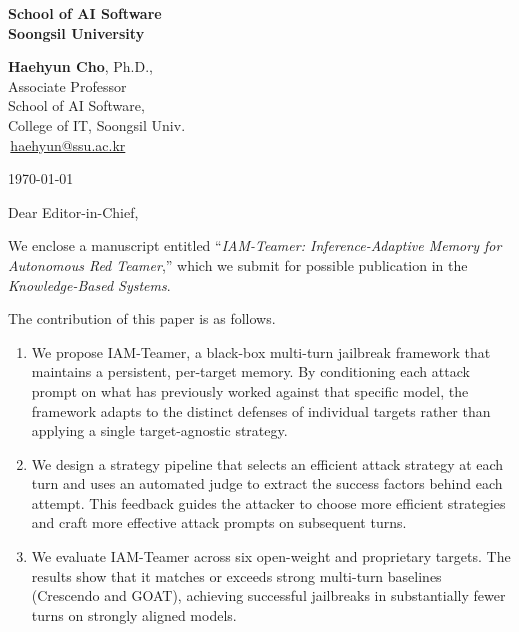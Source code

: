 \documentclass[11pt]{article}
\begin{document}
\thispagestyle{cover}

\noindent
\begin{minipage}[t]{0.5\textwidth}
  \textbf{\large School of AI Software}\\[2pt]
  \textbf{\large Soongsil University}
\end{minipage}\hfill
\begin{minipage}[t]{0.45\textwidth}
  \raggedleft
  \textbf{Haehyun Cho}, Ph.D.,\\
  Associate Professor\\
  School of AI Software,\\
  College of IT, Soongsil Univ.\\
  \Letter\,\href{mailto:haehyun@ssu.ac.kr}{haehyun@ssu.ac.kr}
\end{minipage}

\vspace{2.5\baselineskip}

\begin{flushright}
  \today
\end{flushright}

\vspace{1\baselineskip}

Dear Editor-in-Chief,

We enclose a manuscript entitled ``\textit{IAM-Teamer: Inference-Adaptive Memory for Autonomous Red Teamer},'' which we submit for possible publication in the \textit{Knowledge-Based Systems}.

The contribution of this paper is as follows.

\begin{enumerate}[leftmargin=2.2em,itemsep=0.5\baselineskip,topsep=0.3\baselineskip]
  \item We propose IAM-Teamer, a black-box multi-turn jailbreak framework that maintains a persistent, per-target memory. By conditioning each attack prompt on what has previously worked against that specific model, the framework adapts to the distinct defenses of individual targets rather than applying a single target-agnostic strategy.
  \item We design a strategy pipeline that selects an efficient attack strategy at each turn and uses an automated judge to extract the success factors behind each attempt. This feedback guides the attacker to choose more efficient strategies and craft more effective attack prompts on subsequent turns.
  \item We evaluate IAM-Teamer across six open-weight and proprietary targets. The results show that it matches or exceeds strong multi-turn baselines (Crescendo and GOAT), achieving successful jailbreaks in substantially fewer turns on strongly aligned models.
\end{enumerate}
\end{document}
